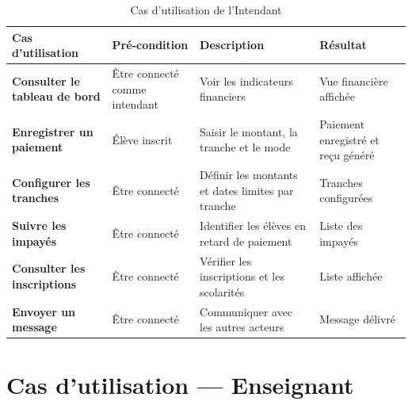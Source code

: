 \documentclass[12pt, a4paper, twoside, openright]{report}
\begin{document}
\begin{table}[htbp]
  \centering
  \caption{Cas d'utilisation de l'Intendant}
  \small
  \begin{tabularx}{\textwidth}{>{\bfseries}p{3.5cm} p{3cm} X p{2.5cm}}
    \toprule
    \textbf{Cas d'utilisation} & \textbf{Pré-condition} & \textbf{Description} & \textbf{Résultat} \\
    \midrule
    Consulter le tableau de bord & Être connecté comme intendant & Voir les indicateurs financiers & Vue financière affichée \\
    Enregistrer un paiement & Élève inscrit & Saisir le montant, la tranche et le mode & Paiement enregistré et reçu généré \\
    Configurer les tranches & Être connecté & Définir les montants et dates limites par tranche & Tranches configurées \\
    Suivre les impayés & Être connecté & Identifier les élèves en retard de paiement & Liste des impayés \\
    Consulter les inscriptions & Être connecté & Vérifier les inscriptions et les scolarités & Liste affichée \\
    Envoyer un message & Être connecté & Communiquer avec les autres acteurs & Message délivré \\
    \bottomrule
  \end{tabularx}
\end{table}

\section{Cas d'utilisation — Enseignant}
\end{document}
